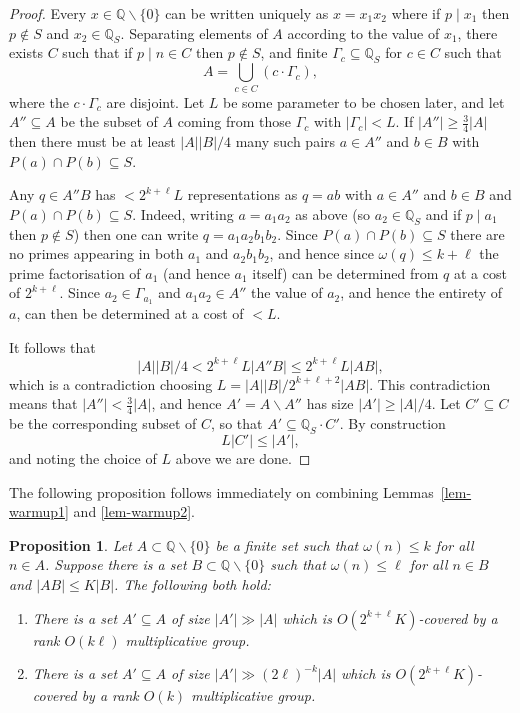 \documentclass{amsart}
\renewcommand{\leq}{\leqslant}
\renewcommand{\geq}{\geqslant}
\newcommand{\bbq}{\mathbb{Q}}
\newcommand{\abs}[1]{\left\lvert #1\right\rvert}
\newtheorem{proposition}{Proposition}
\theoremstyle{definition}
\begin{document}
\begin{proof}
Every $x\in \bbq\backslash\{0\}$ can be written uniquely as $x=x_1x_2$ where if $p\mid x_1$ then $p\not\in S$ and $x_2\in \bbq_S$. Separating elements of $A$ according to the value of $x_1$, there exists $C$ such that if $p\mid n\in C$ then $p\not\in S$, and finite $\Gamma_c\subseteq \bbq_S$ for $c\in C$ such that
\[A=\bigcup_{c\in C}(c\cdot \Gamma_c),\]
where the $c\cdot \Gamma_c$ are disjoint. Let $L$ be some parameter to be chosen later, and let $A''\subseteq A$ be the subset of $A$ coming from those $\Gamma_c$ with $\abs{\Gamma_c}<L$. If $\lvert A''\rvert\geq \tfrac{3}{4}\lvert A\rvert$ then there must be at least $\lvert A\rvert\abs{B}/4$ many such pairs $a\in A''$ and $b\in B$ with $P(a)\cap P(b)\subseteq S$.

Any $q\in A''B$ has $<2^{k+\ell}L$ representations as $q=ab$ with $a\in A''$ and $b\in B$ and $P(a)\cap P(b)\subseteq S$. Indeed, writing $a=a_1a_2$ as above (so $a_2\in \bbq_S$ and if $p\mid a_1$ then $p\not\in S$) then one can write $q=a_1a_2b_1b_2$. Since $P(a)\cap P(b)\subseteq S$ there are no primes appearing in both $a_1$ and $a_2b_1b_2$, and hence since $\omega(q)\leq k+\ell$ the prime factorisation of $a_1$ (and hence $a_1$ itself) can be determined from $q$ at a cost of $2^{k+\ell}$. Since $a_2\in \Gamma_{a_1}$ and $a_1a_2\in A''$ the value of $a_2$, and hence the entirety of $a$, can then be determined at a cost of $<L$. 

It follows that 
\[\lvert A\rvert\abs{B}/4 < 2^{k+\ell}L\abs{A''B}\leq 2^{k+\ell}L\abs{AB},\]
which is a contradiction choosing $L=\lvert A\rvert\abs{B}/2^{k+\ell+2}\abs{AB}$. This contradiction means that $\abs{A''}<\frac{3}{4}\abs{A}$, and hence $A'=A\backslash A''$ has size $\abs{A'}\geq \abs{A}/4$. Let $C'\subseteq C$ be the corresponding subset of $C$, so that $A'\subseteq \bbq_S\cdot C'$. By construction
\[L\lvert C'\rvert \leq \lvert A'\rvert,\]
and noting the choice of $L$ above we are done.
\end{proof}

The following proposition follows immediately on combining Lemmas~\ref{lem-warmup1} and \ref{lem-warmup2}.

\begin{proposition}\label{prop-small}
Let $A\subset \bbq\backslash \{0\}$ be a finite set such that $\omega(n)\leq k$ for all $n\in A$. Suppose there is a set $B\subset \bbq\backslash\{0\}$ such that $\omega(n)\leq \ell$ for all $n\in B$ and $\abs{AB}\leq K\abs{B}$. The following both hold:

\begin{enumerate}
\item There is a set $A'\subseteq A$ of size $\abs{A'}\gg \abs{A}$ which is $O(2^{k+\ell}K)$-covered by a rank $O(k\ell)$ multiplicative group.
\item There is a set $A'\subseteq A$ of size $\abs{A'}\gg (2\ell)^{-k}\abs{A}$ which is $O(2^{k+\ell}K)$-covered by a rank $O(k)$ multiplicative group.
\end{enumerate}

\end{proposition}
\end{document}
